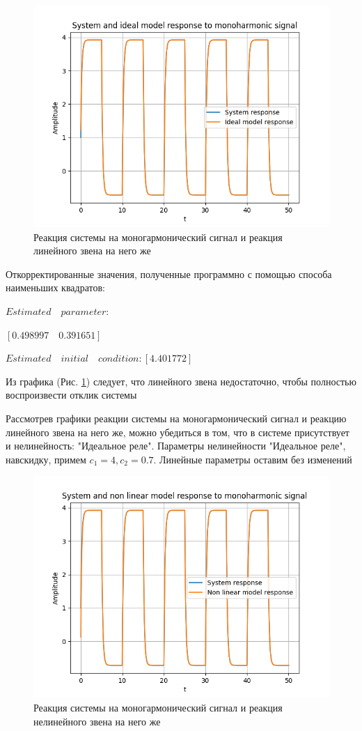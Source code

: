 \begin{figure}[H]
	\centering
	\includegraphics[width=0.9\linewidth]{body/images/System-and-ideal-model-response-to-monoharmonic-signal.png}
	\caption{Реакция системы на моногармонический сигнал и реакция линейного звена на него же}
	\label{fig:3}
\end{figure}

Откорректированные значения, полученные программно с помощью способа наименьших квадратов:

$Estimated\quad parameter:$

\qquad$[0.498997\quad 0.391651]$

$Estimated\quad initial\quad condition: [4.401772]$

Из графика (Рис. \ref{fig:3}) следует, что линейного звена недостаточно, чтобы полностью воспроизвести отклик системы

Рассмотрев графики реакции системы на моногармонический сигнал и реакцию линейного звена на него же, можно убедиться в том,
что в системе присутствует и нелинейность: "Идеальное реле". Параметры нелинейности "Идеальное реле", навскидку, примем $ c_1 = 4, c_2 = 0.7 $. Линейные параметры оставим без изменений

\begin{figure}[H]
	\centering
	\includegraphics[width=0.9\linewidth]{body/images/System-and-non-linear-model-response-to-monoharmonic-signal.png}
	\caption{Реакция системы на моногармонический сигнал и реакция нелинейного звена на него же}
	\label{fig:4}
\end{figure}

